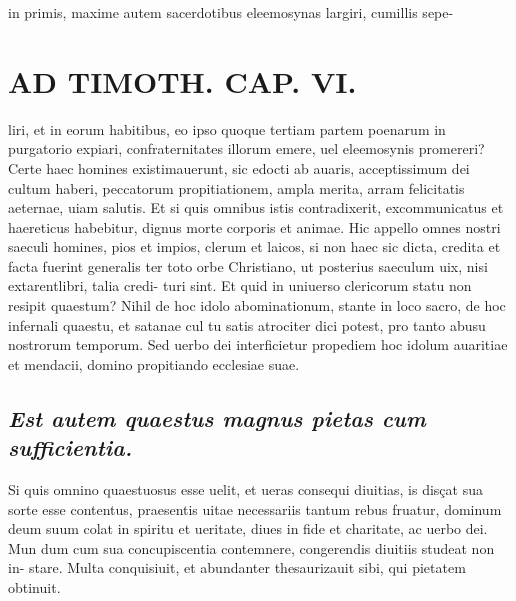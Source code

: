 \documentclass{article}
\begin{document}
\begin{pages}
in primis, maxime autem sacerdotibus eleemosynas largiri, cumillis sepe-  \pend
\section*{AD TIMOTH. CAP. VI. }
\marginpar{[ p.533 ]}\pstart liri, et in eorum habitibus, eo ipso quoque tertiam partem poenarum in purgatorio expiari, confraternitates illorum emere, uel eleemosynis promereri? Certe haec homines existimauerunt, sic edocti ab auaris, acceptissimum dei cultum haberi, peccatorum propitiationem, ampla merita, arram felicitatis aeternae, uiam salutis. Et si quis omnibus istis contradixerit, excommunicatus et haereticus habebitur, dignus morte corporis et animae. Hic appello omnes nostri saeculi homines, pios et impios, clerum et laicos, si non haec sic dicta, credita et facta fuerint generalis ter toto orbe Christiano, ut posterius saeculum uix, nisi extarentlibri, talia credi- turi sint. Et quid in uniuerso clericorum statu non resipit quaestum? Nihil de hoc idolo abominationum, stante in loco sacro, de hoc infernali quaestu, et satanae cul tu satis atrociter dici potest, pro tanto abusu nostrorum temporum. Sed uerbo dei interficietur propediem hoc idolum auaritiae et mendacii, domino propitiando ecclesiae suae.  \pend
{}
{}
\subsection*{\textit{Est autem quaestus magnus pietas cum sufficientia. }}\pstart Si quis omnino quaestuosus esse uelit, et ueras consequi diuitias, is disçat sua sorte esse contentus, praesentis uitae necessariis tantum rebus fruatur, dominum deum suum colat in spiritu et ueritate, diues in fide et charitate, ac uerbo dei. Mun dum cum sua concupiscentia contemnere, congerendis diuitiis studeat non in- stare. Multa conquisiuit, et abundanter thesaurizauit sibi, qui pietatem obtinuit.  \pend
{}
{}

\end{pages}
\end{document}

